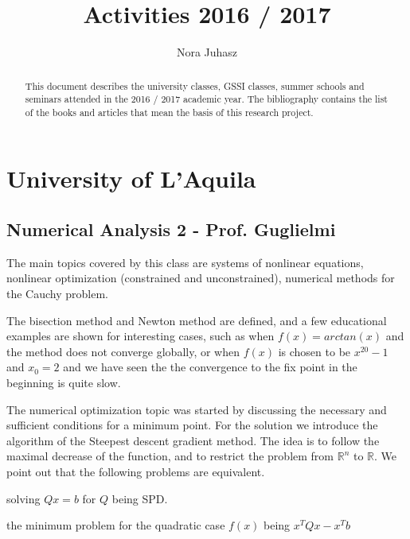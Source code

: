 \documentclass{article}
\title{Activities 2016 / 2017}
\author{Nora Juhasz}
\begin{document}
\maketitle
\newpage

\begin{abstract}

This document describes the university classes, GSSI classes, summer schools and seminars attended in the 2016 / 2017 academic year. The bibliography contains the list of the books and articles that mean the basis of this research project.\\

\end{abstract}
\newpage

\tableofcontents
\newpage

\section{University of L'Aquila}

\subsection{Numerical Analysis 2 - Prof. Guglielmi}
The main topics covered by this class are systems of nonlinear equations, nonlinear optimization (constrained and unconstrained), numerical methods for the Cauchy problem.

The bisection method and Newton method are defined, and a few educational examples are shown for interesting cases, such as when $f(x) = arctan(x)$ and the method does not converge globally, or when $f(x)$ is chosen to be $x^{20} - 1$ and $x_0 = 2$ and we have seen the the convergence to the fix point in the beginning is quite slow.

The numerical optimization topic was started by discussing the necessary and sufficient conditions for a minimum point. For the solution we introduce the algorithm of the Steepest descent gradient method. The idea is to follow the maximal decrease of the function, and to restrict the problem from $\mathbb{R}^n$ to $\mathbb{R}$. We point out that the following problems are equivalent.

\begin{outline}[enumerate]

\1 solving $Qx = b$ for $Q$ being SPD.

\1 the minimum problem for the quadratic case $f(x)$ being $x^TQx - x^Tb$

\end{outline}
\end{document}

